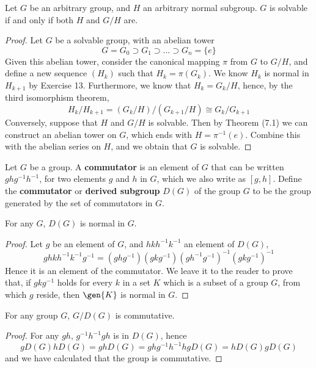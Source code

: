 \begin{theorem}
    Let $G$ be an arbitrary group, and $H$ an arbitrary normal subgroup. $G$ is solvable if and only if both $H$ and $G/H$ are.
\end{theorem}
\begin{proof}
    Let $G$ be a solvable group, with an abelian tower
    \[ G = G_0 \supset G_1 \supset \dots \supset G_n = \{ e \} \]
    Given this abelian tower, consider the canonical mapping $\pi$ from $G$ to $G/H$, and define a new sequence $(H_k)$ such that $H_k = \pi(G_k)$. We know $H_k$ is normal in $H_{k+1}$ by Exercise 13. Furthermore, we know that $H_k = G_k/H$, hence, by the third isomorphism theorem,
    \[ H_k/H_{k+1} = (G_k/H)/(G_{k+1}/H) \cong G_k/G_{k+1} \]
    Conversely, suppose that $H$ and $G/H$ is solvable. Then by Theorem (7.1) we can construct an abelian tower on $G$, which ends with $H = \pi^{-1}(e)$. Combine this with the abelian series on $H$, and we obtain that $G$ is solvable.
\end{proof}

Let $G$ be a group. A {\bf commutator} is an element of $G$ that can be written $ghg^{-1}h^{-1}$, for two elements $g$ and $h$ in $G$, which we also write as $[g,h]$. Define the {\bf commutator} or {\bf derived subgroup} $D(G)$ of the group $G$ to be the group generated by the set of commutators in $G$.

\begin{lemma}
    For any $G$, $D(G)$ is normal in $G$.
\end{lemma}
\begin{proof}
    Let $g$ be an element of $G$, and $hkh^{-1}k^{-1}$ an element of $D(G)$,
    \[ ghkh^{-1}k^{-1}g^{-1} = (ghg^{-1})(gkg^{-1})(gh^{-1}g^{-1})^{-1}(gkg^{-1})^{-1} \]
    Hence it is an element of the commutator. We leave it to the reader to prove that, if $gkg^{-1}$ holds for every $k$ in a set $K$ which is a subset of a group $G$, from which $g$ reside, then $\gen{K}$ is normal in $G$.
\end{proof}

\begin{lemma}
    For any group $G$, $G/D(G)$ is commutative.
\end{lemma}
\begin{proof}
    For any $gh$, $g^{-1}h^{-1}gh$ is in $D(G)$, hence
    \[ gD(G)hD(G) = ghD(G) = ghg^{-1}h^{-1}hgD(G) = hD(G)gD(G) \]
    and we have calculated that the group is commutative.
\end{proof}

